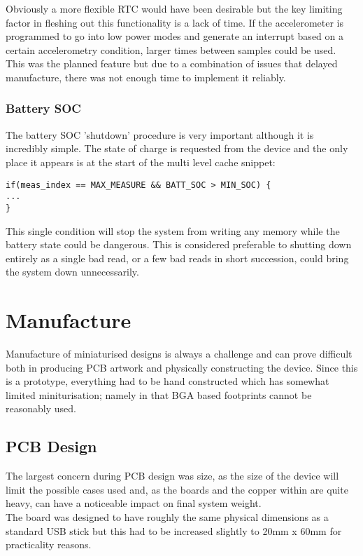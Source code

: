 \documentclass[12pt,openany,a4paper]{book}
\begin{document}
        	Obviously a more flexible RTC would have been desirable but the key limiting factor in fleshing out this functionality is a lack of time. If the accelerometer is programmed to go into low power modes and generate an interrupt based on a certain accelerometry condition, larger times between samples could be used. This was the planned feature but due to a combination of issues that delayed manufacture, there was not enough time to implement it reliably.
        	
			\subsubsection{Battery SOC}
			
			The battery SOC 'shutdown' procedure is very important although it is incredibly simple. The state of charge is requested from the device and the only place it appears is at the start of the multi level cache snippet: \\
			\begin{lstlisting}
if(meas_index == MAX_MEASURE && BATT_SOC > MIN_SOC) {
...
}
			\end{lstlisting}
			This single condition will stop the system from writing any memory while the battery state could be dangerous. This is considered preferable to shutting down entirely as a single bad read, or a few bad reads in short succession, could bring the system down unnecessarily.\\
	\newpage
	\section{Manufacture}
		Manufacture of miniaturised designs is always a challenge and can prove difficult both in producing PCB artwork and physically constructing the device. Since this is a prototype, everything had to be hand constructed which has somewhat limited miniturisation; namely in that BGA based footprints cannot be reasonably used. 
		
		\subsection{PCB Design}
			The largest concern during PCB design was size, as the size of the device will limit the possible cases used and, as the boards and the copper within are quite heavy, can have a noticeable impact on final system weight. \\
			
			The board was designed to have roughly the same physical dimensions as a standard USB stick but this had to be increased slightly to 20mm x 60mm for practicality reasons. \\
			
\end{document}
